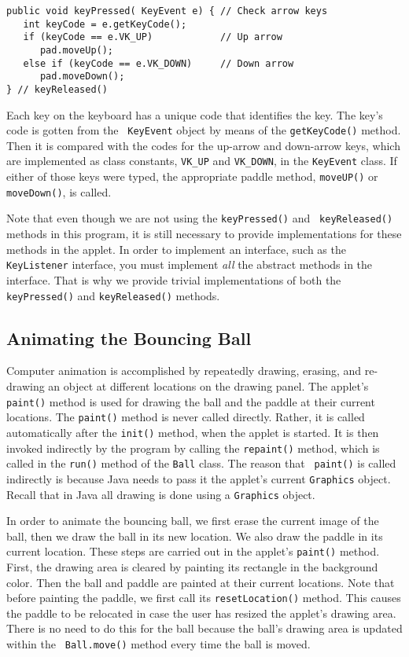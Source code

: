 \begin{jjjlisting}
\begin{lstlisting}
public void keyPressed( KeyEvent e) { // Check arrow keys
   int keyCode = e.getKeyCode();
   if (keyCode == e.VK_UP)            // Up arrow
      pad.moveUp();
   else if (keyCode == e.VK_DOWN)     // Down arrow
      pad.moveDown();
} // keyReleased()
\end{lstlisting}
\end{jjjlisting}

\noindent Each key on the keyboard has a unique code that 
identifies the key. The key's code is gotten from the {\tt
KeyEvent} object by means of the {\tt getKeyCode()} method. Then it is
compared with the codes for the up-arrow and down-arrow keys, which
are implemented as class constants, {\tt VK\_UP} and {\tt VK\_DOWN},
in the {\tt KeyEvent} class.  If either of those keys were typed, the
appropriate paddle method, {\tt moveUP()} or {\tt moveDown()}, is
called.  

Note that even though we are not using the {\tt keyPressed()} and {\tt
keyReleased()} methods in this program, it is still necessary to
provide implementations for these methods in the applet.  In order to
implement an interface, such as the {\tt KeyListener} interface, you
must implement {\em all} the abstract methods in the interface.  That
is why we provide trivial implementations of both the {\tt
keyPressed()} and {\tt keyReleased()} methods.

\subsection{Animating the Bouncing Ball}

Computer animation is accomplished by repeatedly drawing, erasing, and
re-drawing an object at different locations on the drawing panel.  The
applet's {\tt paint()} method is used for drawing the ball and the
paddle at their current locations.  The {\tt paint()} method is never
called directly. Rather, it is called automatically after the {\tt init()}
method, when the applet is started. It is then invoked indirectly by
the program by calling the {\tt repaint()} method, which is called in
the {\tt run()} method of the {\tt Ball} class.  The reason that {\tt
paint()} is called indirectly is because Java needs to pass it the
applet's current {\tt Graphics} object. Recall that in Java all
drawing is done using a {\tt Graphics} object.

In order to animate the bouncing ball, we first erase the current
image of the ball, then we draw the ball in its new location. We also
draw the paddle in its current location. These steps are carried out
in the applet's {\tt paint()} method. First, the drawing area is
cleared by painting its rectangle in the background color.  Then the
ball and paddle are painted at their current locations. Note that
before painting the paddle, we first call its {\tt resetLocation()}
method. This causes the paddle to be relocated in case the user has
resized the applet's drawing area.  There is no need to do this for
the ball because the ball's drawing area is updated within the {\tt
Ball.move()} method every time the ball is moved.

